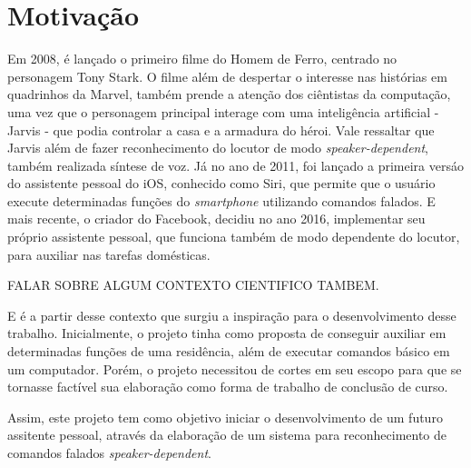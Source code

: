 \documentclass[a4paper,12pt,twoside,openright]{report}
\begin{document}
\section{Motiva\c{c}\~{a}o}
\par Em 2008, \'{e} lan{\c c}ado o primeiro filme do Homem de Ferro, centrado no personagem Tony Stark. O filme al\'{e}m de despertar o interesse nas hist\'{o}rias em quadrinhos da Marvel, tamb\'{e}m prende a aten{\c c}\~{a}o dos ci\^{e}ntistas da computa{\c c}\~{a}o, uma vez que o personagem principal interage com uma intelig\^{e}ncia artificial - Jarvis - que podia controlar a casa e a armadura do h\'{e}roi. Vale ressaltar que Jarvis al\'{e}m de fazer reconhecimento do locutor de modo \textit{speaker-dependent}, tamb\'{e}m realizada s\'{i}ntese de voz. J\'{a} no ano de 2011, foi lan{\c c}ado a primeira vers\'{a}o do assistente pessoal do iOS, conhecido como Siri, que permite que o usu\'{a}rio execute determinadas fun{\c c}\~{o}es do \textit{smartphone} utilizando comandos falados. E mais recente, o criador do Facebook, decidiu no ano 2016, implementar seu pr\'{o}prio assistente pessoal, que funciona tamb\'{e}m de modo dependente do locutor, para auxiliar nas tarefas dom\'{e}sticas.
\par FALAR SOBRE ALGUM CONTEXTO CIENTIFICO TAMBEM.
\par E \'{e} a partir desse contexto que surgiu a inspira{\c c}\~{a}o para o desenvolvimento desse trabalho. Inicialmente, o projeto tinha como proposta de conseguir auxiliar em determinadas fun{\c c}\~{o}es de uma resid\^{e}ncia, al\'{e}m de executar comandos b\'{a}sico em um computador. Por\'{e}m, o projeto necessitou de cortes em seu escopo para que se tornasse fact\'{i}vel sua elabora{\c c}\~{a}o como forma de trabalho de conclus\~{a}o de curso.
\par Assim, este projeto tem como objetivo iniciar o desenvolvimento de um futuro assitente pessoal, atrav\'{e}s da elabora{\c c}\~{a}o de um sistema para reconhecimento de comandos falados \textit{speaker-dependent}. 

\end{document}
